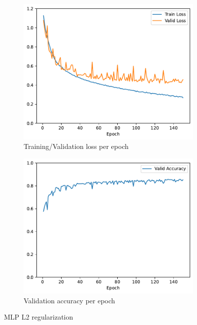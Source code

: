 \documentclass[11pt]{article}
\begin{document}
\begin{figure}[h!]
\centering
\begin{subfigure}{.5\textwidth}
  \centering
  \includegraphics[width=.9\linewidth]{plots/mlp-training-loss-batch-256-lr-0.1-epochs-150-hidden-200-dropout-0.0-l2-0.0001-layers-2-act-relu-opt-sgd.pdf}
  \caption{Training/Validation loss per epoch}
\end{subfigure}%
\begin{subfigure}{.5\textwidth}
  \centering
  \includegraphics[width=.9\linewidth]{plots/mlp-validation-accuracy-batch-256-lr-0.1-epochs-150-hidden-200-dropout-0.0-l2-0.0001-layers-2-act-relu-opt-sgd}
  \caption{Validation accuracy per epoch}
\end{subfigure}
\caption{MLP L2 regularization}
\label{fig:MLP_L2_regularization}
\end{figure}
\end{document}
